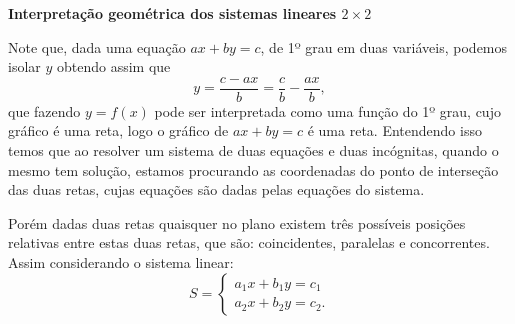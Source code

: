 \textbf{Interpretação geométrica dos sistemas lineares $2 \times 2$}

Note que, dada uma equação $ax + by= c$, de 1º grau em duas variáveis, podemos isolar $y$ obtendo assim que
\[y= \frac{c - ax}{b}= \frac{c}{b} - \frac{ax}{b},\]
que fazendo $y= f(x)$ pode ser interpretada como uma função do 1º grau, cujo gráfico é uma reta, logo o gráfico de $ax + by= c$ é uma reta. Entendendo isso temos que ao resolver um sistema de duas equações e duas incógnitas, quando o mesmo tem solução, estamos procurando as coordenadas do ponto de interseção das duas retas, cujas equações são dadas pelas equações do sistema.

Porém dadas duas retas quaisquer no plano existem três possíveis posições relativas entre estas duas retas, que são: coincidentes, paralelas e concorrentes. Assim considerando o sistema linear:
\[S= \begin{cases}
      a_1x + b_1y= c_1 \\
      a_2x + b_2y= c_2.
     \end{cases}\]

